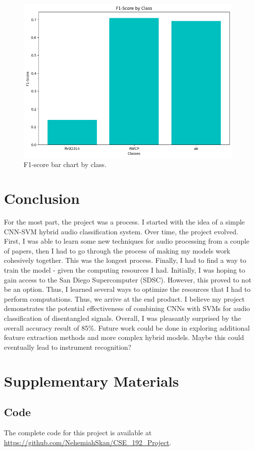 \documentclass{article}
\begin{document}
\begin{figure}[H] %
\centering
\includegraphics[width=\textwidth]{f1_score.png}
\caption{F1-score bar chart by class.}
\label{fig:f1_score}
\end{figure}

\section{Conclusion}
For the most part, the project was a process. I started with the idea of a simple CNN-SVM hybrid audio classification system. Over time, the project evolved. First, I was able to learn some new techniques for audio processing from a couple of papers, then I had to go through the process of making my models work cohesively together. This was the longest process. Finally, I had to find a way to train the model - given the computing resources I had. Initially, I was hoping to gain access to the San Diego Supercomputer (SDSC). However, this proved to not be an option. Thus, I learned several ways to optimize the resources that I had to perform computations. Thus, we arrive at the end product. I believe my project demonstrates the potential effectiveness of combining CNNs with SVMs for audio classification of disentangled signals. Overall, I was pleasantly surprised by the overall accuracy result of 85\%. Future work could be done in exploring additional feature extraction methods and more complex hybrid models. Maybe this could eventually lead to instrument recognition?

\section{Supplementary Materials}
\subsection{Code}
The complete code for this project is available at \url{https://github.com/NehemiahSkan/CSE_192_Project}.


\end{document}

